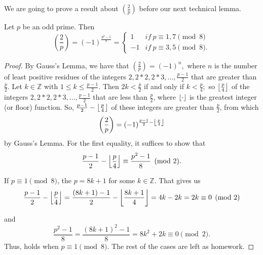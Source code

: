 \documentclass{ximera}
\begin{document}
We are going to prove a result about $\left(\frac{2}{p}\right)$ before our next technical lemma.

\begin{theorem}
 Let $p$ be an odd prime. Then 
	\begin{equation*}
	\left(\frac{2}{p}\right)=(-1)^{\frac{p^2-1}{8}}=
		\begin{cases}
		1& if\ p\equiv 1,7 \pmod 8\\
		-1 & if\ p\equiv 3,5 \pmod 8.
		\end{cases}
	\end{equation*}

	\begin{proof}
	By Gauss's Lemma, we have that $\left(\frac{2}{p}\right)=(-1)^n,$ where $n$ is the number of least positive residues of the integers $2,2*2,2*3,\dots,\frac{p-1}{2}$ that are greater than $\frac{p}{2}$. Let $k\in\mathbb{Z}$ with $1\leq k\leq \frac{p-1}{2}$. Then $2k<{\frac{p}{2}}
	$ if and only  if $k<\frac{p}{4};$ so $\left\lfloor \frac{p}{4}\right\rfloor
	$ of the integers $2,2*2,2*3,\dots,\frac{p-1}{2}$ that are less than $\frac{p}{2}$, where $\left\lfloor \cdot\right\rfloor$ is the greatest integer (or floor) function. So, $\frac{p-1}{2}-\left\lfloor \frac{p}{4}\right\rfloor$  of these integers are greater than $\frac{p}{2}$, from which 
			\[
				\left(\frac{2}{p}\right)=
				(-1)^{\frac{p-1}{2}-\left\lfloor \frac{p}{4}\right\rfloor} 
			\]
		by Gauss's Lemma. For the first equality, it suffices to show that 
			\[
				\frac{p-1}{2}-\left\lfloor \frac{p}{4}\right\rfloor
				\equiv \frac{p^2-1}{8} \pmod 2. 
			\]
	
	If $p\equiv 1 \pmod 8$, the $p=8k+1$ for some $k\in\mathbb{Z}$. That gives us
			\[
				\frac{p-1}{2}-\left\lfloor \frac{p}{4}\right\rfloor
				=\frac{(8k+1)-1}{2}-\left\lfloor \frac{8k+1}{4}\right\rfloor
				=4k-2k
				=2k\equiv 0 \pmod 2 
			\]
		
		and
			\[
				\frac{p^2-1}{8}
				=\frac{(8k+1)^2-1}{8}=8k^2+2k\equiv 0\pmod 2.
			\]
	Thus,  holds when $p\equiv 1 \pmod 8$. The rest of the cases are left as homework.
	\end{proof}
\end{theorem}
\end{document}
